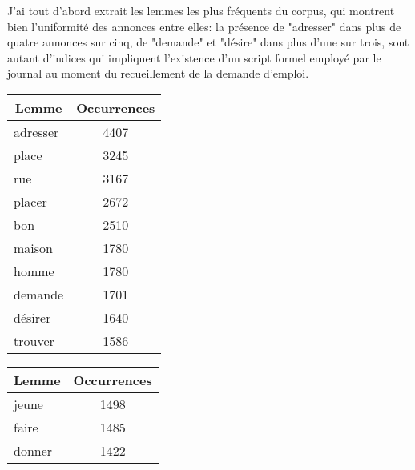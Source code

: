 J'ai tout d'abord extrait les lemmes les plus fréquents du corpus, qui montrent bien l'uniformité des annonces entre elles: la présence de "adresser" dans plus de quatre annonces sur cinq, de "demande" et "désire" dans plus d'une sur trois, sont autant d'indices qui impliquent l'existence d'un script formel employé par le journal au moment du recueillement de la demande d'emploi. 

\begin{table}[ht]
	\parbox{.45\linewidth}{
		\centering
		\begin{tabular}{lc}
			\hline
			\multicolumn{1}{c}{\textbf{Lemme}} & \multicolumn{1}{c}{\textbf{Occurrences}} \\ \hline
			adresser                           & 4407                                      \\
			place                              & 3245                                      \\
			rue                                & 3167                                      \\
			placer                             & 2672                                      \\
			bon                                & 2510                                      \\
			maison                             & 1780                                      \\ 
			homme                              & 1780                                      \\ 
			demande                            & 1701                                      \\ 
			désirer                            & 1640                                      \\ 
			trouver                            & 1586                                      \\ \hline
		\end{tabular}
	}
	\hfill
	\parbox{.45\linewidth}{
		\centering
		\begin{tabular}{lc}
			\hline
			\multicolumn{1}{c}{\textbf{Lemme}} & \multicolumn{1}{c}{\textbf{Occurrences}} \\ \hline
			jeune                              & 1498                                      \\ 
			faire                              & 1485                                      \\ 
			donner                             & 1422                                      \\ 

\end{tabular}}
\end{table}
